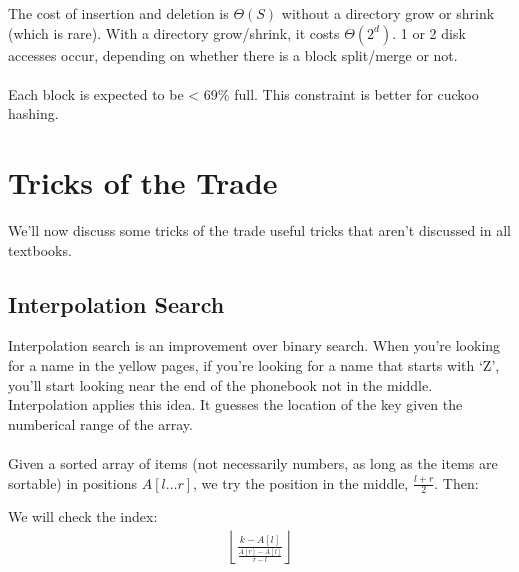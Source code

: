 \documentclass[]{article}
\theoremstyle{definition}
\begin{document}
			The cost of insertion and deletion is $\Theta(S)$ without a directory grow or shrink (which is rare). With a directory grow/shrink, it costs $\Theta(2^d)$. 1 or 2 disk accesses occur, depending on whether there is a block split/merge or not.
			\\ \\
			Each block is expected to be < 69\% full. This constraint is better for cuckoo hashing.
	
	\section{Tricks of the Trade}
		We'll now discuss some tricks of the trade \textendash{} useful tricks that aren't discussed in all textbooks.

		\subsection{Interpolation Search}
			Interpolation search is an improvement over binary search. When you're looking for a name in the yellow pages, if you're looking for a name that starts with `Z', you'll start looking near the end of the phonebook \textendash{} not in the middle. Interpolation applies this idea. It guesses the location of the key given the numberical range of the array.
			\\ \\
			Given a sorted array of items (not necessarily numbers, as long as the items are sortable) in positions $A[l \ldots r]$, we try the position in the middle, $\frac{l + r}{2}$. Then: \\
			\begin{algorithm}[H]
			\end{algorithm}

			We will check the index:
			\begin{align*}
				\left \lfloor \frac{k - A[l]}{\frac{A[r] - A[l]}{r - l}} \right \rfloor
			\end{align*}
\end{document}
